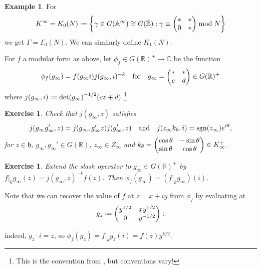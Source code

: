 \documentclass[11pt]{report}
\let\mbb\mathbb
\let\mf\mathfrak
\newcommand{\1}{\mathbbm 1}
\newcommand{\Z}{\mathbb{Z}}
\newcommand{\R}{\mathbb{R}}
\newcommand{\C}{\mathbb{C}}
\newcommand{\A}{\mbb A}
\newcommand*{\defeq}{\mathrel{\vcenter{\baselineskip0.5ex \lineskiplimit0pt
      \hbox{\scriptsize.}\hbox{\scriptsize.}}}%
  =}
\DeclareMathOperator{\sgn}{sgn}
\theoremstyle{plain}
\newcounter{ex}
\newtheorem{exercise}[ex]{Exercise}
\theoremstyle{definition}
\newtheorem{example}[thm]{Example}
\theoremstyle{remark}
\numberwithin{equation}{section}
\begin{document}
\begin{example}
  For
  \begin{equation}
    \label{eq:26}
K^{\infty} = K_{0}(N) \defeq \qty{\gamma \in G(\A^{\infty}) \cong G(\hat{\Z}) : \gamma \equiv \mqty(*
  & * \\ 0 & *) \bmod{N}}
  \end{equation}
we get $\Gamma = \Gamma_{0}(N)$. We can similarly define $K_{1}(N)$. 
\end{example}
For $f$ a modular form as above, let $\phi_{f} \in G(\R)^{+} \to \C$ be the
function
\begin{equation}
  \label{eq:16}
  \phi_{f}(g_{\infty}) = f(g_{\infty}i)j(g_{\infty},i)^{-k} \qq{for} g_{\infty} =  \mqty(*  & * \\ c & d)\in G(\R)^{+}
\end{equation}
where $j(g_{\infty},i) \defeq \det(g_{\infty})^{-1/2}(cz+d)$.\footnote{This is
  the convention from \cite{gelbart1973}, but conventions vary!}

\begin{exercise}
  Check that $j(g_{\infty},z)$ satisfies
  \begin{equation}
    \label{eq:26}
    j(g_{\infty}g_{\infty}',z) = j(g_{\infty},g_{\infty}'z)j(g_{\infty}',z) \qq{and} j(z_{\infty}k_{\theta},i) = \sgn(z_{\infty})e^{i\theta},
  \end{equation}
  for $z \in \mf h$, $g_{\infty},g_{\infty}' \in G(\R)$,
  $z_{\infty} \in Z_{\infty}$ and
  $k_{\theta} = \mqty(\cos \theta & -\sin \theta \\ \sin \theta & \cos \theta) \in
  K_{\infty}^{+}$.
\end{exercise}

\begin{exercise}
Extend the slash operator to $g_{\infty} \in G(\R)^{+}$ by $f|_{k}g_{\infty}(z) =
j(g_{\infty},z)^{-k}f(z)$. Then $\phi_{f}(g_{\infty}) = (f|_{k}g_{\infty})(i)$. 
\end{exercise}
Note that we can recover the value of $f$ at $z = x+iy$ from
$\phi_{f}$ by evaluating at
\begin{equation}
  \label{eq:38}
g_{z} \defeq \mqty(y^{1/2} & xy^{1/2} \\ 0& y^{-1/2}):
\end{equation}

indeed, $g_{z}\cdot i = z$, so
$\phi_{f}(g_{z}) = f|_{k}g_{z}(i) = f(z) y^{k/2}$.
\end{document}
